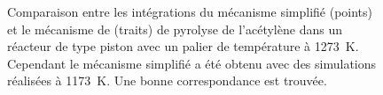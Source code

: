 \begin{figure}[h]
  \centering{}

  \caption{\label{norinaga-comparison-simplification-1273K}Comparaison entre les intégrations du mécanisme simplifié (points) et le mécanisme de \citet{Norinaga2009} (traits) de pyrolyse de l'acétylène dans un réacteur de type piston avec un palier de température à \SI{1273}{\kelvin}. Cependant le mécanisme simplifié a été obtenu avec des simulations réalisées à \SI{1173}{\kelvin}. Une bonne correspondance est trouvée.}
\end{figure}

\clearpage

